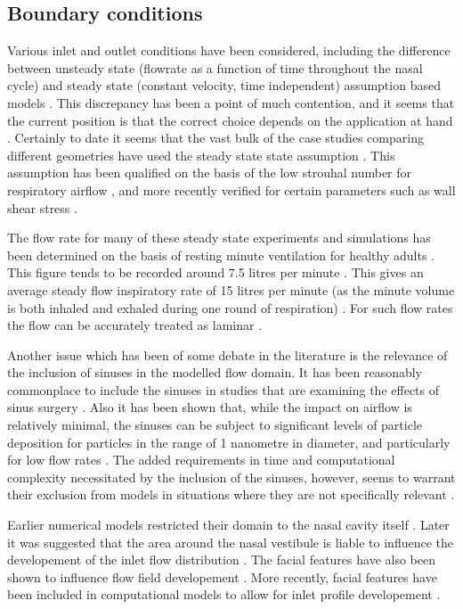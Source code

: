 \subsection*{Boundary conditions}
Various inlet and outlet conditions have been considered, including the difference between unsteady state  (flowrate as a function of time throughout the nasal cycle) \cite{Shi2006} and steady state (constant velocity, time independent) assumption based models \cite{Wen2008}. This discrepancy has been a point of much contention, and it seems that the current position is that the correct choice depends on the application at hand \cite{Doorly2008c}. Certainly to date it seems that the vast bulk of the case studies comparing different geometries have used the steady state state assumption \cite{Xi2012, Zhu2011, Garcia2007, Doorly2008c, Keyhani1995, Subramaniam1998, Wen2008}. This assumption has been qualified on the basis of the low strouhal number for respiratory airflow \cite{Keyhani1995}, and more recently verified for certain parameters such as wall shear stress \cite{Doorly2008c}.


The flow rate for many of these steady state experiments and simulations has been determined on the basis of resting minute ventilation for healthy adults \cite{Subramaniam1998, Wen2008}. This figure tends to be recorded around 7.5 litres per minute \cite{Chaya2006, Tobin1983}. This gives an average steady flow inspiratory rate of 15 litres per minute (as the minute volume is both inhaled and exhaled during one round of respiration) \cite{Subramaniam1998}. For such flow rates the flow can be accurately treated as laminar \cite{Doorly2008c, Hahn1993}.


Another issue which has been of some debate in the literature is the relevance of the inclusion of sinuses in the modelled flow domain. It has been reasonably commonplace to include the sinuses in studies that are examining the effects of sinus surgery \cite{Xiong2008a, Lindemann2005}. Also it has been shown that, while the impact on airflow is relatively minimal, the sinuses can be subject to significant levels of particle deposition for particles in the range of 1 nanometre in diameter, and particularly for low flow rates \cite{Ge2012}. The added requirements in time and computational complexity necessitated by the inclusion of the sinuses, however, seems to warrant their exclusion from models in situations where they are not specifically relevant \cite{Doorly2008c}.


Earlier numerical models restricted their domain to the nasal cavity itself \cite{Keyhani1995, Subramaniam1998, Wen2008}. Later it was suggested that the area around the nasal vestibule is liable to influence the developement of the inlet flow distribution \cite{Doorly2008}. The facial features have also been shown to influence flow field developement \cite{Anthony2005}. More recently, facial features have been included in computational models to allow for inlet profile developement \cite{Li2012, Lee2010}.


